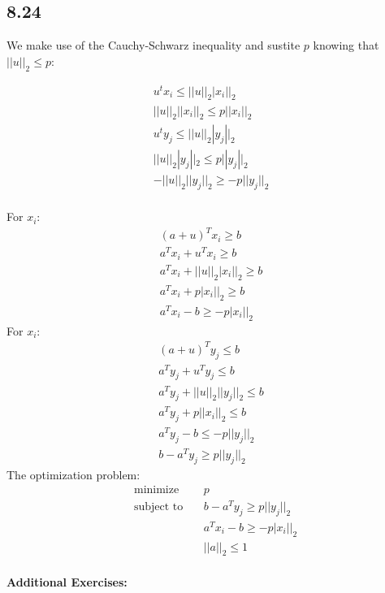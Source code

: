 \documentclass[12pt]{article}
\newenvironment{proposition}[2][Proposition]{\begin{trivlist}
\item[\hskip \labelsep {\bfseries #1}\hskip \labelsep {\bfseries #2.}]}{\end{trivlist}}
\begin{document}
\subsection*{8.24}
We make use of the Cauchy-Schwarz inequality and sustite $p$ knowing that $||u||_2 \le p$:
\begin{proposition}{1}
\begin{align}
u^tx_i \le ||u||_2|x_i||_2\\
||u||_2||x_i||_2 \le p||x_i||_2\\
u^ty_j \le ||u||_2|y_j||_2\\
||u||_2|y_j||_2 \le p||y_j||_2\\
-||u||_2||y_j||_2 \ge -p||y_j||_2\\
\end{align}
\end{proposition}
For $x_i$:
\begin{equation*}
\begin{aligned}
(a+u)^Tx_i \ge b\\
a^Tx_i+u^Tx_i \ge b\\
a^Tx_i+||u||_2|x_i||_2 \ge b\\
a^Tx_i+p|x_i||_2 \ge b\\
a^Tx_i-b \ge -p|x_i||_2
\end{aligned}
\end{equation*}
For $x_i$:
\begin{equation*}
\begin{aligned}
(a+u)^Ty_j \le b\\
a^Ty_j+u^Ty_j \le b\\
a^Ty_j+||u||_2||y_j||_2 \le b\\
a^Ty_j+p||x_i||_2 \le b\\
a^Ty_j-b \le -p||y_j||_2\\
b-a^Ty_j \ge p||y_j||_2
\end{aligned}
\end{equation*}
The optimization problem:
\begin{equation*}
\begin{aligned}
& \underset{}{\text{minimize}}
& & p\\
& \text{subject to}\
& & b-a^Ty_j \ge p||y_j||_2\\
&&& a^Tx_i-b \ge -p|x_i||_2\\
&&& ||a||_2 \le 1
\end{aligned}
\end{equation*}\\
\textbf{Additional Exercises:}\\
\end{document}
